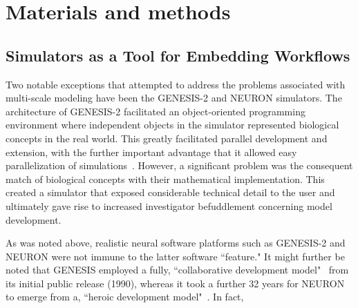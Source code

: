 \documentclass[10pt,letterpaper]{article}
\begin{document}
\section*{Materials and methods}


\subsection*{Simulators as a Tool for Embedding Workflows}
Two notable exceptions that attempted to address the problems associated with multi-scale modeling have been the GENESIS-2 and NEURON simulators.  The architecture of GENESIS-2 facilitated an object-oriented programming environment where independent objects in the simulator represented biological concepts in the real world. This greatly facilitated parallel development and extension, with the further important advantage that it allowed easy parallelization of simulations~\cite{goddard97:_paral_genes}. However, a significant problem was the consequent match of biological concepts with their mathematical implementation. This created a simulator that exposed considerable technical detail to the user and ultimately gave rise to increased investigator befuddlement concerning model development.

As was noted above, realistic neural software platforms such as GENESIS-2 and NEURON were not immune to the latter software ``feature." It might further be noted that GENESIS employed a fully, ``collaborative development model"~\cite{gewaltig14} from its initial public release (1990), whereas it took a further 32 years for NEURON to emerge from a, ``heroic development model"~\cite{gewaltig14}. In fact,
\end{document}
